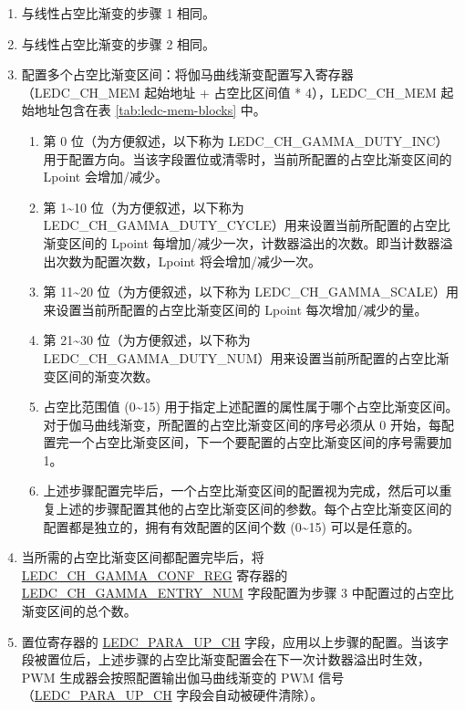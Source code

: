 \documentclass[main\_\_CN.tex]{subfiles}
\begin{document}
\begin{enumerate}
\begin{enumerate}
\begin{enumerate}
    \item 与线性占空比渐变的步骤 1 相同。
    \item 与线性占空比渐变的步骤 2 相同。
    \item 配置多个占空比渐变区间：将伽马曲线渐变配置写入寄存器（LEDC\_CH\_MEM 起始地址 + 占空比区间值 * 4），LEDC\_CH\_MEM 起始地址包含在表 \ref{tab:ledc-mem-blocks} 中。
    \begin{enumerate}
        \item 第 0 位（为方便叙述，以下称为 LEDC\_CH\_GAMMA\_DUTY\_INC）用于配置方向。当该字段置位或清零时，当前所配置的占空比渐变区间的 Lpoint 会增加/减少。
        \item 第 1\textasciitilde10 位（为方便叙述，以下称为 LEDC\_CH\_GAMMA\_DUTY\_CYCLE）用来设置当前所配置的占空比渐变区间的 Lpoint 每增加/减少一次，计数器溢出的次数。即当计数器溢出次数为配置次数，Lpoint 将会增加/减少一次。
        \item 第 11\textasciitilde20 位（为方便叙述，以下称为 LEDC\_CH\_GAMMA\_SCALE）用来设置当前所配置的占空比渐变区间的 Lpoint 每次增加/减少的量。
        \item 第 21\textasciitilde30 位（为方便叙述，以下称为 LEDC\_CH\_GAMMA\_DUTY\_NUM）用来设置当前所配置的占空比渐变区间的渐变次数。
        \item 占空比范围值 (0\textasciitilde15) 用于指定上述配置的属性属于哪个占空比渐变区间。对于伽马曲线渐变，所配置的占空比渐变区间的序号必须从 0 开始，每配置完一个占空比渐变区间，下一个要配置的占空比渐变区间的序号需要加 1。
        \item 上述步骤配置完毕后，一个占空比渐变区间的配置视为完成，然后可以重复上述的步骤配置其他的占空比渐变区间的参数。每个占空比渐变区间的配置都是独立的，拥有有效配置的区间个数 (0\textasciitilde15) 可以是任意的。
    \end{enumerate}
    \item 当所需的占空比渐变区间都配置完毕后，将 \hyperref[regdesc:LEDCCHNGAMMACONFREG]{LEDC\_CH\_GAMMA\_CONF\_REG} 寄存器的 \hyperref[fielddesc:LEDCCHNGAMMAENTRYNUM]{LEDC\_CH\_GAMMA\_ENTRY\_NUM} 字段配置为步骤 3 中配置过的占空比渐变区间的总个数。
    \item 置位寄存器的 \hyperref[fielddesc:LEDCPARAUPCHN]{LEDC\_PARA\_UP\_CH} 字段，应用以上步骤的配置。当该字段被置位后，上述步骤的占空比渐变配置会在下一次计数器溢出时生效，PWM 生成器会按照配置输出伽马曲线渐变的 PWM 信号（\hyperref[fielddesc:LEDCPARAUPCHN]{LEDC\_PARA\_UP\_CH} 字段会自动被硬件清除）。
\end{enumerate}
\end{enumerate}
\end{enumerate}
\end{document}
